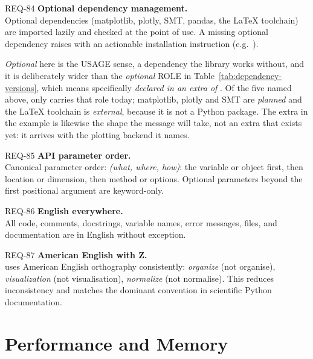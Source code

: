 \begin{reqbox}{REQ-84}{\stable}
\textbf{Optional dependency management.}\\
Optional dependencies (matplotlib, plotly, SMT, pandas, the LaTeX
toolchain) are imported lazily and checked at the point of use. A missing
optional dependency raises  with an
actionable installation instruction (e.g.\
).

\emph{Optional} here is the USAGE sense, a dependency the library works
without, and it is deliberately wider than the \emph{optional} ROLE in
Table~\ref{tab:dependency-versions}, which means specifically
\emph{declared in an extra of }. Of the five named
above, only \code{pandas} carries that role today; matplotlib, plotly
and SMT are \emph{planned} and the LaTeX toolchain is \emph{external},
because it is not a Python package. The \code{itaca[plot]} extra in the
example is likewise the shape the message will take, not an extra that
exists yet: it arrives with the plotting backend it names.
\end{reqbox}

\begin{reqbox}{REQ-85}{\stable}
\textbf{API parameter order.}\\
Canonical parameter order: \emph{(what, where, how)}: the variable or
object first, then location or dimension, then method or options.
Optional parameters beyond the first positional argument are
keyword-only.
\end{reqbox}

\begin{reqbox}{REQ-86}{\stable}
\textbf{English everywhere.}\\
All code, comments, docstrings, variable names, error messages,
 files, and documentation are in English without exception.
\end{reqbox}

\begin{reqbox}{REQ-87}{\stable}
\textbf{American English with Z.}\\
\itc{} uses American English orthography consistently: \emph{organize}
(not organise), \emph{visualization} (not visualisation),
\emph{normalize} (not normalise). This reduces inconsistency and matches
the dominant convention in scientific Python documentation.
\end{reqbox}

\section{Performance and Memory}

